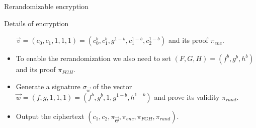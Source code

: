 \begin{frame}{Rerandomizable encryption}
\begin{block}{Details of encryption}
\begin{itemize}
      $\vec{v} = (c_0, c_1, 1, 1, 1) = (c_0^b, c_1^b, g^{1-b}, c_1^{1-b}, c_2^{1-b})$ and its proof $\pi_{enc}$.
    \item To enable the rerandomization we also need to set $(F, G, H) = (f^b, g^b, h^b)$ and its proof $\pi_{FGH}$.
    \item Generate a signature $\sigma_{\vec{w}}$ of the vector $\vec{w} = (f, g, 1, 1, 1) = (f^b, g^b, 1, g^{1-b}, h^{1-b})$ and prove its validity $\pi_{rand}$.
    \item Output the ciphertext $(c_1, c_2, \pi_{\vec{\Theta}}, \pi_{enc}, \pi_{FGH}, \pi_{rand})$.
    \end{itemize}
  \end{block}
\end{frame}

%      
%      
%      
%    


